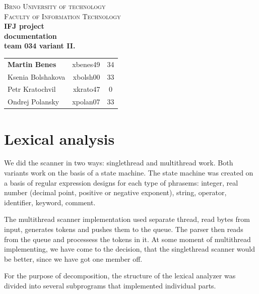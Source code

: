 \documentclass[10pt,a4paper,titlepage]{article}
\begin{document}
\begin{titlepage}

\begin{center}
\textsc{\LARGE Brno University of technology}\\[0.5cm]
\textsc{\large Faculty of Information Technology}\\[7cm]

{ \huge \bfseries IFJ project}\\[0.3cm]
{ \Large \bfseries documentation}\\[0.5cm]
{ \bfseries team 034 variant II.}\\[1cm]

\begin{center}
  \begin{tabular}{  l | r | c }
    {\bf Martin Benes} & xbenes49 & 34 \\
    Ksenia Bolshakova  & xbolsh00 & 33 \\
    Petr Kratochvil    & xkrato47 & 0  \\
    Ondrej Polansky    & xpolan07 & 33 \\
  \end{tabular}
\end{center}

\end{center}

\end{titlepage}
\newpage


\setcounter{page}{1}

\section{Lexical analysis}

\begin{justify}
We did the scanner in two ways: singlethread and multithread work. Both variants work on the basis of a state machine.
The state machine was created on a basis of regular expression designs for each type of phrasems:
integer, real number (decimal point, positive or negative exponent), string, operator, identifier, keyword, comment.

The multithread scanner implementation used separate thread, read bytes from input, generates tokens and pushes
them to the queue. The parser then reads from the queue and processess the tokens in it. At some moment of multithread
implementing, we have come to the decision, that the singlethread scanner would be better, since we have got one member off.

For the purpose of decomposition, the structure of the lexical analyzer was divided into several subprograms
that implemented individual parts.
\end{justify}
\end{document}
